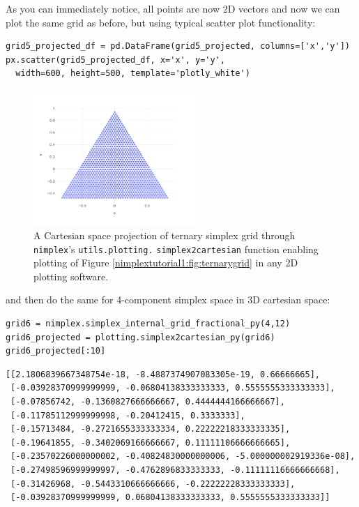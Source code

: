 As you can immediately notice, all points are now 2D vectors and now we
can plot the same grid as before, but using typical scatter plot
functionality:

\begin{verbatim}
grid5_projected_df = pd.DataFrame(grid5_projected, columns=['x','y'])
px.scatter(grid5_projected_df, x='x', y='y', 
  width=600, height=500, template='plotly_white')
\end{verbatim}

\begin{figure}[H]
    \centering
    \includegraphics[width=0.55\textwidth]{nimplexTutorial1/01.QuickStart_27_0.pdf}
    \caption{A Cartesian space projection of ternary simplex grid through \texttt{nimplex}'s \texttt{utils.plotting.} \texttt{simplex2cartesian} function enabling plotting of Figure \ref{nimplextutorial1:fig:ternarygrid} in any 2D plotting software.}
    \label{nimplextutorial1:fig:ternarygridprojected}
\end{figure}

and then do the same for 4-component simplex space in 3D cartesian
space:

\begin{verbatim}
grid6 = nimplex.simplex_internal_grid_fractional_py(4,12)
grid6_projected = plotting.simplex2cartesian_py(grid6)
grid6_projected[:10]
\end{verbatim}

\begin{verbatim}
[[2.1806839667348754e-18, -8.4887374907083305e-19, 0.66666665],
 [-0.03928370999999999, -0.06804138333333333, 0.5555555333333333],
 [-0.07856742, -0.1360827666666667, 0.4444444166666667],
 [-0.11785112999999998, -0.20412415, 0.3333333],
 [-0.15713484, -0.2721655333333334, 0.22222218333333335],
 [-0.19641855, -0.3402069166666667, 0.11111106666666665],
 [-0.23570226000000002, -0.40824830000000006, -5.000000002919336e-08],
 [-0.27498596999999997, -0.4762896833333333, -0.11111116666666668],
 [-0.31426968, -0.5443310666666666, -0.22222228333333333],
 [-0.03928370999999999, 0.06804138333333333, 0.5555555333333333]]
\end{verbatim}

